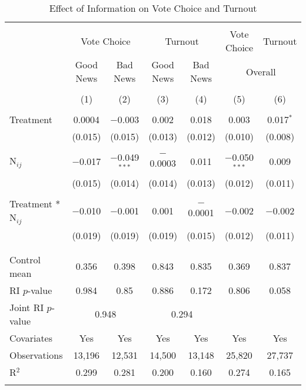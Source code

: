 
\begin{table}[!htbp] \centering 
  \caption{Effect of Information on Vote Choice and Turnout} 
  \label{main_results} 
\begin{tabular}{@{\extracolsep{1pt}}lcccccc} 
\\[-1.8ex]\hline 
\hline \\[-1.8ex] 
 & \multicolumn{2}{c}{Vote Choice}&\multicolumn{2}{c}{Turnout}& Vote Choice & Turnout \\ 
\cline{2-7} 
 & Good News & Bad News & Good News & Bad News & \multicolumn{2}{c}{Overall} \\ 
\\[-1.8ex] & (1) & (2) & (3) & (4) & (5) & (6)\\ 
\hline \\[-1.8ex] 
 Treatment & 0.0004 & $-$0.003 & 0.002 & 0.018 & 0.003 & 0.017$^{*}$ \\ 
  & (0.015) & (0.015) & (0.013) & (0.012) & (0.010) & (0.008) \\ 
  & & & & & & \\ 
 N$_{ij}$ & $-$0.017 & $-$0.049$^{***}$ & $-$0.0003 & 0.011 & $-$0.050$^{***}$ & 0.009 \\ 
  & (0.015) & (0.014) & (0.014) & (0.013) & (0.012) & (0.011) \\ 
  & & & & & & \\ 
 Treatment * N$_{ij}$ & $-$0.010 & $-$0.001 & 0.001 & $-$0.0001 & $-$0.002 & $-$0.002 \\ 
  & (0.019) & (0.019) & (0.019) & (0.015) & (0.012) & (0.011) \\ 
  & & & & & & \\ 
\hline \\[-1.8ex] 
Control mean & 0.356 & 0.398 & 0.843 & 0.835 & 0.369 & 0.837 \\ 
RI $p$-value & 0.984 & 0.85 & 0.886 & 0.172 & 0.806 & 0.058 \\ 
Joint RI $p$-value & \multicolumn{2}{c}{0.948} & \multicolumn{2}{c}{0.294} \\
Covariates & Yes & Yes & Yes & Yes & Yes & Yes \\ 
Observations & 13,196 & 12,531 & 14,500 & 13,148 & 25,820 & 27,737 \\ 
R$^{2}$ & 0.299 & 0.281 & 0.200 & 0.160 & 0.274 & 0.165 \\ 
\hline 
\hline \\[-1.8ex] 
\end{tabular} 

\end{table}
